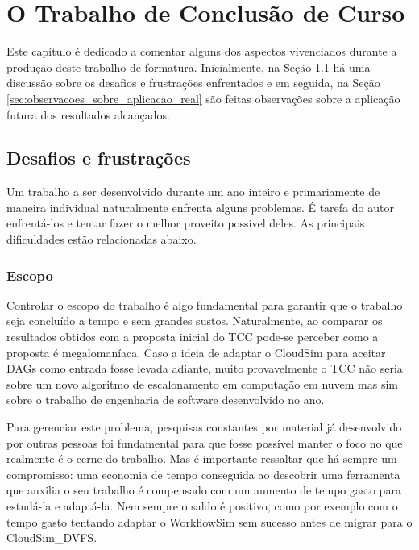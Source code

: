 \chapter{O Trabalho de Conclusão de Curso}
\label{cap:o_tcc}

Este capítulo é dedicado a comentar alguns dos aspectos vivenciados durante a
produção deste trabalho de formatura. Inicialmente, na Seção
\ref{sec:desafios_frustracoes} há uma discussão sobre os desafios e frustrações
enfrentados e em seguida, na Seção \ref{sec:observacoes_sobre_aplicacao_real}
são feitas observações sobre a aplicação futura dos resultados alcançados.

\section{Desafios e frustrações}
\label{sec:desafios_frustracoes}

Um trabalho a ser desenvolvido durante um ano inteiro e primariamente de maneira
individual naturalmente enfrenta alguns problemas. É tarefa do autor enfrentá-los
e tentar fazer o melhor proveito possível deles. As principais dificuldades
estão relacionadas abaixo.

\subsection{Escopo} %
\label{sub:escopo}

Controlar o escopo do trabalho é algo fundamental para garantir que o trabalho
seja concluído a tempo e sem grandes sustos. Naturalmente, ao comparar os
resultados obtidos com a proposta inicial do TCC pode-se perceber como a
proposta é megalomaníaca. Caso a ideia de adaptar o CloudSim para aceitar DAGs
como entrada fosse levada adiante, muito provavelmente o TCC não seria sobre um
novo algoritmo de escalonamento em computação em nuvem mas sim sobre o trabalho
de engenharia de software desenvolvido no ano.

Para gerenciar este problema, pesquisas constantes por material já desenvolvido
por outras pessoas foi fundamental para que fosse possível manter o foco
no que realmente é o cerne do trabalho. Mas é importante ressaltar que há sempre
um compromisso: uma economia de tempo conseguida ao descobrir uma ferramenta que
auxilia o seu trabalho é compensado com um aumento de tempo gasto para estudá-la
e adaptá-la. Nem sempre o saldo é positivo, como por exemplo com o tempo gasto
tentando adaptar o WorkflowSim sem sucesso antes de migrar para o CloudSim\_DVFS.

